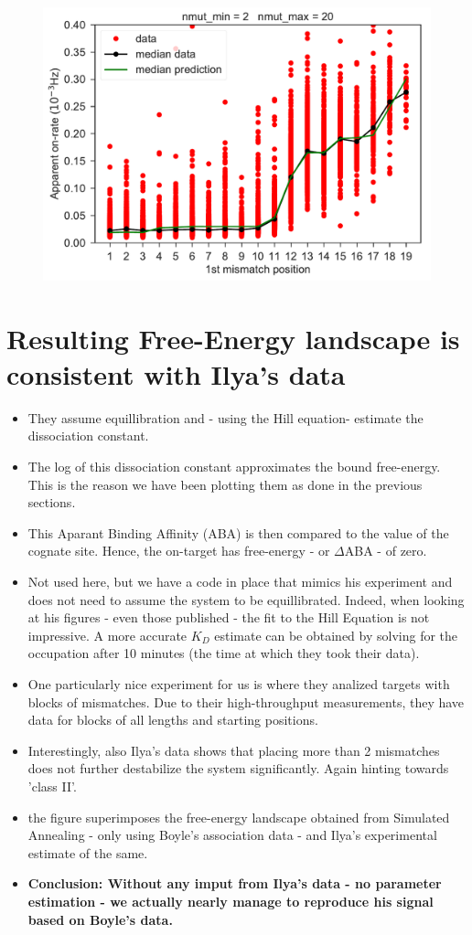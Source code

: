 \documentclass[a4paper,twoside]{revtex4-1}
\begin{document}
\begin{figure}[H]
\includegraphics[scale=0.5]{fig31_10_10_2018.pdf}
\end{figure}


\section{Resulting Free-Energy landscape is consistent with Ilya's data}
\begin{itemize}
\item They assume equillibration and - using the Hill equation- estimate the dissociation constant. 
\item The log of this dissociation constant approximates the bound free-energy. This is the reason we have been plotting them as done in the previous sections.
\item This Aparant Binding Affinity (ABA) is then compared to the value of the cognate site. Hence, the on-target has free-energy - or $\Delta$ABA - of zero. 
\item Not used here, but we have a code in place that mimics his experiment and does not need to assume the system to be equillibrated. Indeed, when looking at his figures - even those published - the fit to the Hill Equation is not impressive. A more accurate $K_D$ estimate can be obtained by solving for the occupation after 10 minutes (the time at which they took their data).
\item One particularly nice experiment for us is where they analized targets with blocks of mismatches. Due to their high-throughput measurements, they have data for blocks of all lengths and starting positions. 
\item Interestingly, also Ilya's data shows that placing more than 2 mismatches does not further destabilize the system significantly. Again hinting towards 'class II'.
\item the figure superimposes the free-energy landscape obtained from Simulated Annealing - only using  Boyle's association data - and Ilya's experimental estimate of the same. 
\item \textbf{Conclusion: Without any imput from Ilya's data - no parameter estimation - we actually nearly manage to reproduce his signal based on Boyle's data.}
\end{itemize}
\end{document}
